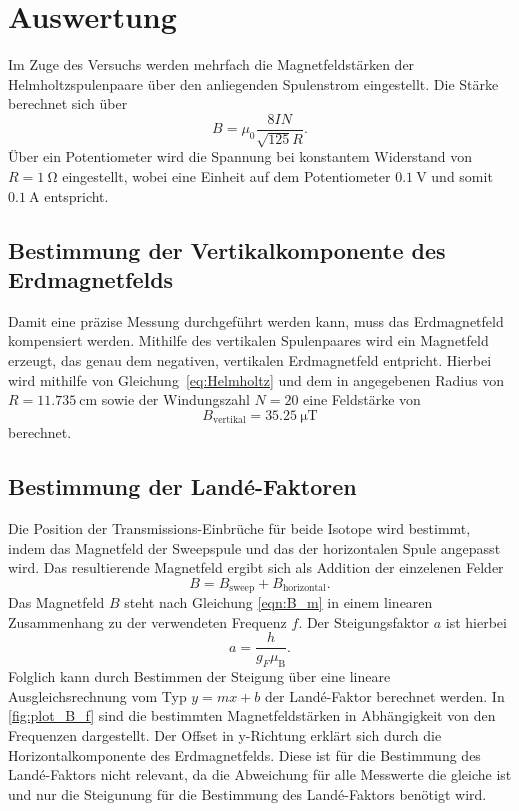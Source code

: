 \section{Auswertung}
\label{sec:Auswertung}
Im Zuge des Versuchs werden mehrfach die Magnetfeldstärken der Helmholtzspulenpaare über den anliegenden Spulenstrom eingestellt. Die Stärke berechnet sich
über 
\begin{equation}
  \label{eq:Helmholtz}
  B = \mu_0 \frac{8 I N}{\sqrt{125} R}.
\end{equation}
Über ein Potentiometer wird die Spannung bei konstantem Widerstand von $R=\qty{1}{\ohm}$ eingestellt, wobei eine Einheit auf dem Potentiometer $\qty{0,1}{\volt}$
und somit $\qty{0,1}{\ampere}$ entspricht.

\subsection{Bestimmung der Vertikalkomponente des Erdmagnetfelds}
Damit eine präzise Messung durchgeführt werden kann, muss das Erdmagnetfeld kompensiert werden. Mithilfe des vertikalen Spulenpaares wird ein Magnetfeld erzeugt,
das genau dem negativen, vertikalen Erdmagnetfeld entpricht. Hierbei wird mithilfe von Gleichung~\eqref{eq:Helmholtz} und dem in \cite{v21} angegebenen
Radius von $R=\qty{11,735}{\centi\metre}$ sowie der Windungszahl $N=20$ eine Feldstärke von
\begin{equation*}
  B_{\text{vertikal}} = \qty{35.25}{\micro\tesla}
\end{equation*}
berechnet.

\subsection{Bestimmung der Landé-Faktoren}
\label{sec:Landéfaktoren}
Die Position der Transmissions-Einbrüche für beide Isotope wird bestimmt, indem das Magnetfeld der Sweepspule und das der horizontalen Spule angepasst wird.
Das resultierende Magnetfeld ergibt sich als Addition der einzelenen Felder
\begin{equation*}
  B = B_{\text{sweep}} + B_{\text{horizontal}}.
\end{equation*}
Das Magnetfeld $B$ steht nach Gleichung \eqref{eqn:B_m} in einem linearen Zusammenhang zu der verwendeten Frequenz $f$. Der Steigungsfaktor $a$ ist
hierbei
\begin{equation*}
  a = \frac{h}{g_F \mu_{\text{B}}}.
\end{equation*}
Folglich kann durch Bestimmen der Steigung über eine lineare Ausgleichsrechnung vom Typ $y=mx+b$ der Landé-Faktor berechnet werden. In \autoref{fig:plot_B_f} sind
die bestimmten Magnetfeldstärken in Abhängigkeit von den Frequenzen dargestellt.
Der Offset in y-Richtung erklärt sich durch die Horizontalkomponente des Erdmagnetfelds. Diese ist für die Bestimmung des Landé-Faktors nicht relevant, da die 
Abweichung für alle Messwerte die gleiche ist und nur die Steigunung für die Bestimmung des Landé-Faktors benötigt wird.

